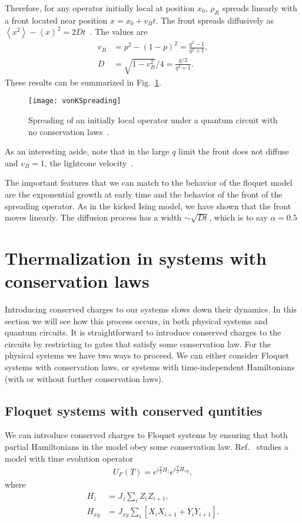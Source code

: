 \documentclass[a4paper,12pt]{article}
\newcommand{\ex}[1]{\left\langle #1 \right\rangle}
\newcommand{\nn}{\nonumber\\}
\newcommand{\note}[1]{{\color{red}{#1}}}
\begin{document}
Therefore, for any operator initially local at position $x_0$, $\rho_R$ spreads linearly with a front located near position $x = x_0 + v_B t$. The front spreads diffusively as $\ex{x^2}-\ex{x}^2=2Dt$~\cite{vonKeyserlingkHydro}. The values are
\begin{align}
v_B &= p^2-(1-p)^2 = \frac{q^2-1}{q^2+1},\nn
D   &= \sqrt{1-v_B^2}/4 = \frac{q/2}{q^2+1}.
\end{align}
These results can be summarized in Fig.~\ref{fig:vonKSpreading}.
\begin{figure}
	\centering
	\texttt{[image: vonKSpreading]}
	\caption{Spreading of an initially local operator under a quantum circuit with no conservation laws~\cite{vonKeyserlingkHydro}.}
	\label{fig:vonKSpreading}
\end{figure}
As an interesting aside, note that in the large $q$ limit the front does not diffuse and $v_B=1$, the lightcone velocity~\cite{NahumOpSp}.

The important features that we can match to the behavior of the floquet model are the exponential growth at early time and the behavior of the front of the spreading operator. As in the kicked Ising model, we have shown that the front moves linearly. The diffusion process has a width $\sim \sqrt{Dt}$, which is to say $\alpha=0.5$

\note{vonKeyserlingk page 6.}


\section{Thermalization in systems with conservation laws} \label{sec:cons}

Introducing conserved charges to our systems slows down their dynamics. In this section we will see how this process occurs, in both physical systems and quantum circuits. It is straightforward to introduce conserved charges to the circuits by restricting to gates that satisfy some conservation law. For the physical systems we have two ways to proceed. We can either consider Floquet systems with conservation laws, or systems with time-independent Hamiltonians (with or without further conservation laws).

\subsection{Floquet systems with conserved quntities} \label{sub:fcons}

We can introduce conserved charges to Floquet systems by ensuring that both partial Hamiltonians in the model obey some conservation law. Ref.~\cite{KhemaniOpSp} studies a model with time evolution operator
\begin{align}
U_F(T)=e^{i\frac{T}{2}H_z}e^{i\frac{T}{2}H_{xy}},
\end{align}
where
\begin{align}
H_z &= J_z\sum_i Z_iZ_{i+1},\nn
H_{xy} &= J_{xy}\sum_i\left[X_iX_{i+1}+Y_iY_{i+1}\right].
\end{align}
\end{document}
